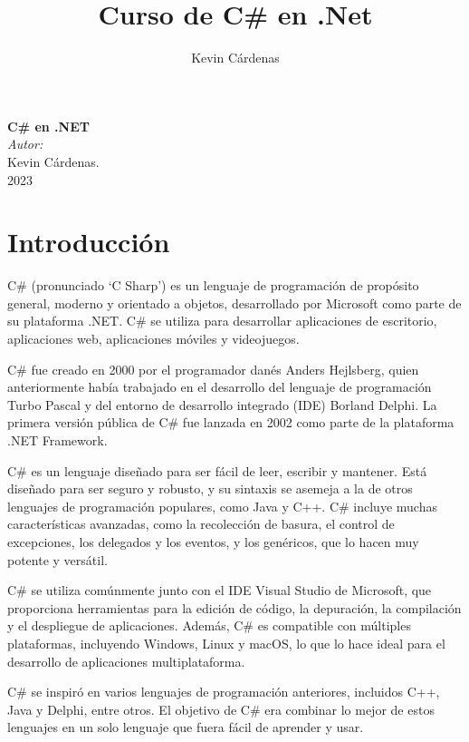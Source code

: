 \documentclass[executivepaper]{article}
\title{Curso de C\# en .Net}
\author{Kevin Cárdenas}
\begin{document}
\begin{titlepage}
    \begin{center}
        {\Huge \textbf{C\# en .NET}}
        \\[19cm]
        
        \large\emph{Autor:}\\
        Kevin Cárdenas.
        \\
        2023
    \end{center}
\end{titlepage}

\newpage
\tableofcontents
\newpage

\section{Introducción}
C\# (pronunciado \enquote*{C Sharp}) es un lenguaje de programación de propósito general, moderno y orientado a objetos, desarrollado por Microsoft como parte de su plataforma .NET. C\# se utiliza para desarrollar aplicaciones de escritorio, aplicaciones web, aplicaciones móviles y videojuegos.

C\# fue creado en 2000 por el programador danés Anders Hejlsberg, quien anteriormente había trabajado en el desarrollo del lenguaje de programación Turbo Pascal y del entorno de desarrollo integrado (IDE) Borland Delphi. La primera versión pública de C\# fue lanzada en 2002 como parte de la plataforma .NET Framework.

C\# es un lenguaje diseñado para ser fácil de leer, escribir y mantener. Está diseñado para ser seguro y robusto, y su sintaxis se asemeja a la de otros lenguajes de programación populares, como Java y C++. C\# incluye muchas características avanzadas, como la recolección de basura, el control de excepciones, los delegados y los eventos, y los genéricos, que lo hacen muy potente y versátil.

C\# se utiliza comúnmente junto con el IDE Visual Studio de Microsoft, que proporciona herramientas para la edición de código, la depuración, la compilación y el despliegue de aplicaciones. Además, C\# es compatible con múltiples plataformas, incluyendo Windows, Linux y macOS, lo que lo hace ideal para el desarrollo de aplicaciones multiplataforma.

C\# se inspiró en varios lenguajes de programación anteriores, incluidos C++, Java y Delphi, entre otros. El objetivo de C\# era combinar lo mejor de estos lenguajes en un solo lenguaje que fuera fácil de aprender y usar.
\end{document}

